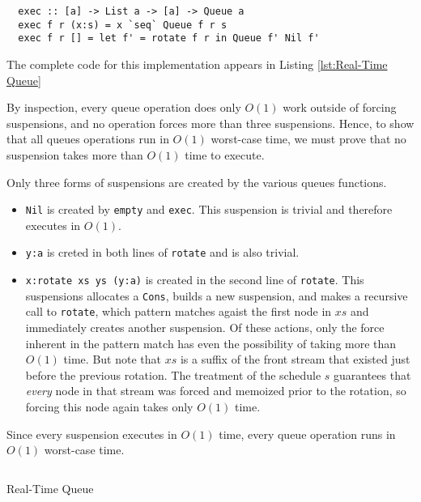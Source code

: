 \documentclass[12pt, a4paper]{article} %
\newcommand{\code}[1]{\texttt{#1}} %
\begin{document}
\begin{verbatim}
  exec :: [a] -> List a -> [a] -> Queue a
  exec f r (x:s) = x `seq` Queue f r s
  exec f r [] = let f' = rotate f r in Queue f' Nil f'
\end{verbatim}

The complete code for this implementation appears in Listing \ref{lst:Real-Time Queue}

By inspection, every queue operation does only $O(1)$ work outside of forcing suspensions, and no operation forces more than three suspensions. Hence, to show that all queues operations run in $O(1)$ worst-case time, we must prove that no suspension takes more than $O(1)$ time to execute.

Only three forms of suspensions are created by the various queues functions.

\begin{itemize}
  \item \code{Nil} is created by \code{empty} and \code{exec}. This suspension is trivial and therefore executes in $O(1)$.
  \item \code{y:a} is creted in both lines of \code{rotate} and is also trivial.
  \item \code{x:rotate xs ys (y:a)} is created in the second line of \code{rotate}. This suspensions allocates a \code{Cons}, builds a new suspension, and makes a recursive call to \code{rotate}, which pattern matches agaist the first node in $xs$ and immediately creates another suspension. Of these actions, only the force inherent in the pattern match has even the possibility of taking more than $O(1)$ time. But note that $xs$ is a suffix of the front stream that existed just before the previous rotation. The treatment of the schedule $s$ guarantees that \textit{every} node in that stream was forced and memoized prior to the rotation, so forcing this node again takes only $O(1)$ time.
\end{itemize}

Since every suspension executes in $O(1)$ time, every queue operation runs in $O(1)$ worst-case time.

\begin{listing}[H]
    \inputminted[breaklines=true]{haskell}{../../Chapter7/RealTimeQueue.hs}
    \caption{Real-Time Queue}
    \label{lst:Real-Time Queue}
\end{listing}
\end{document}
